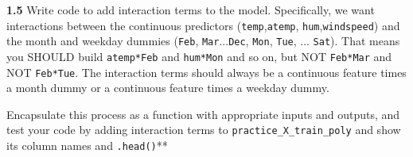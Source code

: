 \documentclass[11pt]{article}
\begin{document}
    \textbf{1.5} Write code to add interaction terms to the model.
Specifically, we want interactions between the continuous predictors
(\texttt{temp},\texttt{atemp}, \texttt{hum},\texttt{windspeed}) and the
month and weekday dummies (\texttt{Feb}, \texttt{Mar}...\texttt{Dec},
\texttt{Mon}, \texttt{Tue}, ... \texttt{Sat}). That means you SHOULD
build \texttt{atemp*Feb} and \texttt{hum*Mon} and so on, but NOT
\texttt{Feb*Mar} and NOT \texttt{Feb*Tue}. The interaction terms should
always be a continuous feature times a month dummy or a continuous
feature times a weekday dummy.

Encapsulate this process as a function with appropriate inputs and
outputs, and test your code by adding interaction terms to
\texttt{practice\_X\_train\_poly} and show its column names and
\texttt{.head()}**
\end{document}
